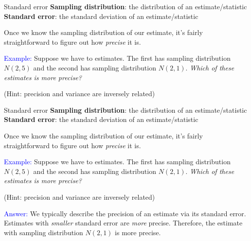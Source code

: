 \documentclass[10pt,t]{beamer}
\begin{document}
\begin{frame}{Standard error}
\textbf{Sampling distribution}: the distribution of an estimate/statistic
\textbf{Standard error}: the standard deviation of an estimate/statistic

\vspace{0.3cm} 

Once we know the sampling distribution of our estimate, it's fairly straightforward to figure out how \textit{precise} it is. 

\vspace{0.3cm}

\textcolor{blue}{Example:} Suppose we have to estimates. The first has sampling distribution $N(2, 5)$ and the second has sampling distribution $N(2, 1)$. \textit{Which of these estimates is more precise?}

\vspace{0.3cm}

\small (Hint: precision and variance are inversely related)


\end{frame}

\begin{frame}{Standard error}
\textbf{Sampling distribution}: the distribution of an estimate/statistic
\textbf{Standard error}: the standard deviation of an estimate/statistic

\vspace{0.3cm} 

Once we know the sampling distribution of our estimate, it's fairly straightforward to figure out how \textit{precise} it is. 

\vspace{0.3cm}

\textcolor{blue}{Example:} Suppose we have to estimates. The first has sampling distribution $N(2, 5)$ and the second has sampling distribution $N(2, 1)$. \textit{Which of these estimates is more precise?}

\vspace{0.3cm}

\small (Hint: precision and variance are inversely related)

\vspace{0.3cm}

\normalsize \textcolor{blue}{Answer:} We typically describe the precision of an estimate via its standard error. Estimates with \textit{smaller} standard error are \textit{more} precise. Therefore, the estimate with sampling distribution $N(2, 1)$ is more precise.
\end{frame}
\end{document}
